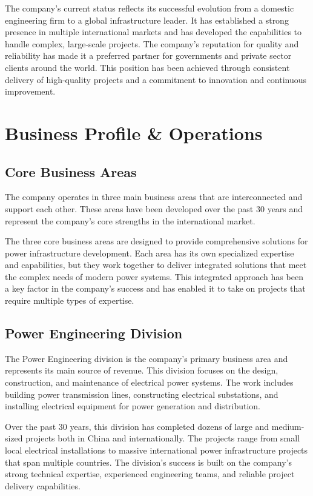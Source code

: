 The company's current status reflects its successful evolution from a domestic engineering firm to a global infrastructure leader. It has established a strong presence in multiple international markets and has developed the capabilities to handle complex, large-scale projects. The company's reputation for quality and reliability has made it a preferred partner for governments and private sector clients around the world. This position has been achieved through consistent delivery of high-quality projects and a commitment to innovation and continuous improvement.

\section{Business Profile \& Operations}

\subsection{Core Business Areas}
The company operates in three main business areas that are interconnected and support each other. These areas have been developed over the past 30 years and represent the company's core strengths in the international market.

The three core business areas are designed to provide comprehensive solutions for power infrastructure development. Each area has its own specialized expertise and capabilities, but they work together to deliver integrated solutions that meet the complex needs of modern power systems. This integrated approach has been a key factor in the company's success and has enabled it to take on projects that require multiple types of expertise.

\subsection{Power Engineering Division}
The Power Engineering division is the company's primary business area and represents its main source of revenue. This division focuses on the design, construction, and maintenance of electrical power systems. The work includes building power transmission lines, constructing electrical substations, and installing electrical equipment for power generation and distribution.

Over the past 30 years, this division has completed dozens of large and medium-sized projects both in China and internationally. The projects range from small local electrical installations to massive international power infrastructure projects that span multiple countries. The division's success is built on the company's strong technical expertise, experienced engineering teams, and reliable project delivery capabilities.

